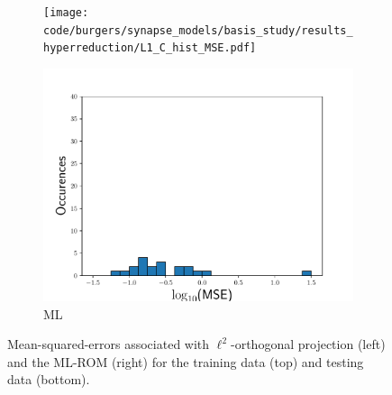 \documentclass[3p,computermodern,10pt]{elsarticle}
\begin{document}
\begin{figure}
\begin{center}
\begin{subfigure}[t]{0.33\textwidth}
\texttt{[image: code/burgers/synapse\_models/basis\_study/results\_hyperreduction/L1\_C\_hist\_MSE.pdf]}
\caption{\PSTLONEROMCOLLOC}
\end{subfigure}
\begin{subfigure}[t]{0.33\textwidth}
\includegraphics[trim={0cm 0cm 0cm 0cm},clip,width=1.0\linewidth]{code/burgers/synapse_models/basis_study/results_hyperreduction/ML_hist_MSE.pdf}
\caption{ML}
\end{subfigure}
\caption{Mean-squared-errors associated with $\ell^2$-orthogonal projection (left) and the ML-ROM (right) for the training data (top) and testing data (bottom).}
\label{fig:burg_hist_hyper}
\end{center}
\end{figure}
\end{document}
